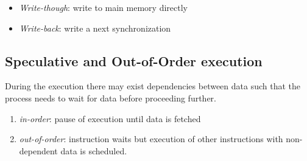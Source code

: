 \documentclass{article}
\begin{document}
\begin{itemize}
\item \textit{Write-though}: write to main memory directly
\item \textit{Write-back}: write a next synchronization
\end{itemize}

\subsection{Speculative and Out-of-Order execution}

During the execution there may exist dependencies between data such that the process needs to wait for data before proceeding further.

\begin{enumerate}
\item \textit{in-order}: pause of execution until data is fetched
\item \textit{out-of-order}: instruction waits but execution of other instructions with non-dependent data is scheduled.
\end{enumerate}
\end{document}
